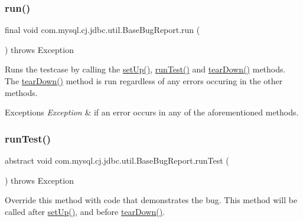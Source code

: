 \subsubsection{\texorpdfstring{run()}{run()}}
{\footnotesize\ttfamily final void com.\+mysql.\+cj.\+jdbc.\+util.\+Base\+Bug\+Report.\+run (\begin{DoxyParamCaption}{ }\end{DoxyParamCaption}) throws Exception}

Runs the testcase by calling the \mbox{\hyperlink{classcom_1_1mysql_1_1cj_1_1jdbc_1_1util_1_1_base_bug_report_ad320a1b51efdb6c84a11050708d59d51}{set\+Up()}}, \mbox{\hyperlink{classcom_1_1mysql_1_1cj_1_1jdbc_1_1util_1_1_base_bug_report_ac3abccb9a116e7fadc6087927166909c}{run\+Test()}} and \mbox{\hyperlink{classcom_1_1mysql_1_1cj_1_1jdbc_1_1util_1_1_base_bug_report_a425288fa4310585fc86c736ec94e8033}{tear\+Down()}} methods. The \mbox{\hyperlink{classcom_1_1mysql_1_1cj_1_1jdbc_1_1util_1_1_base_bug_report_a425288fa4310585fc86c736ec94e8033}{tear\+Down()}} method is run regardless of any errors occuring in the other methods.


\begin{DoxyExceptions}{Exceptions}
{\em Exception} & if an error occurs in any of the aforementioned methods. \\
\hline
\end{DoxyExceptions}
\mbox{\label{classcom_1_1mysql_1_1cj_1_1jdbc_1_1util_1_1_base_bug_report_ac3abccb9a116e7fadc6087927166909c}} 
\subsubsection{\texorpdfstring{run\+Test()}{runTest()}}
{\footnotesize\ttfamily abstract void com.\+mysql.\+cj.\+jdbc.\+util.\+Base\+Bug\+Report.\+run\+Test (\begin{DoxyParamCaption}{ }\end{DoxyParamCaption}) throws Exception\hspace{0.3cm}{\ttfamily [abstract]}}

Override this method with code that demonstrates the bug. This method will be called after \mbox{\hyperlink{classcom_1_1mysql_1_1cj_1_1jdbc_1_1util_1_1_base_bug_report_ad320a1b51efdb6c84a11050708d59d51}{set\+Up()}}, and before \mbox{\hyperlink{classcom_1_1mysql_1_1cj_1_1jdbc_1_1util_1_1_base_bug_report_a425288fa4310585fc86c736ec94e8033}{tear\+Down()}}.


